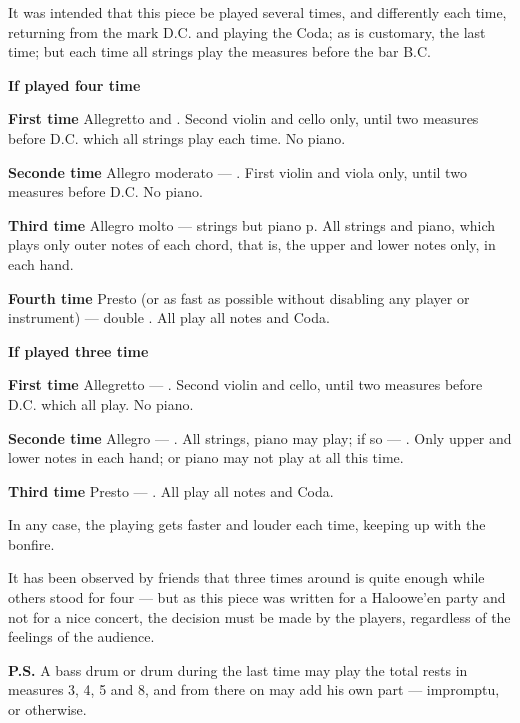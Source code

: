\newpage

It was intended that this piece be played several times, and differently each time, returning from the mark D.C. and playing the Coda; as is customary, the last time; but each time all strings play the measures before the bar B.C.

\begin{center}
\textbf{If played four time}
\end{center}

\textbf{First time} Allegretto and . Second violin and cello only, until two measures before D.C. which all strings play each time. No piano.

\textbf{Seconde time} Allegro moderato --- . First violin and viola only, until two measures before D.C. No piano.

\textbf{Third time} Allegro molto --- strings  but piano {p}. All strings and piano, which plays only outer notes of each chord, that is, the upper and lower notes only, in each hand.

\textbf{Fourth time} Presto (or as fast as possible without disabling any player or instrument) --- double . All play all notes and Coda.



\begin{center}
\textbf{If played three time}
\end{center}

\textbf{First time} Allegretto --- . Second violin and cello, until two measures before D.C. which all play. No piano.

\textbf{Seconde time} Allegro --- . All strings, piano may play; if so --- . Only upper and lower notes in each hand; or piano may not play at all this time.

\textbf{Third time} Presto --- . All play all notes and Coda.

In any case, the playing gets faster and louder each time, keeping up with the bonfire.

It has been observed by friends that three times around is quite enough while others stood for four --- but as this piece was written for a Haloowe'en party and not for a nice concert, the decision must be made by the players, regardless of the feelings of the audience.

\textbf{P.S.} A bass drum or drum during the last time may play the total rests in measures 3, 4, 5 and 8, and from there on may add his own part --- impromptu, or otherwise.









